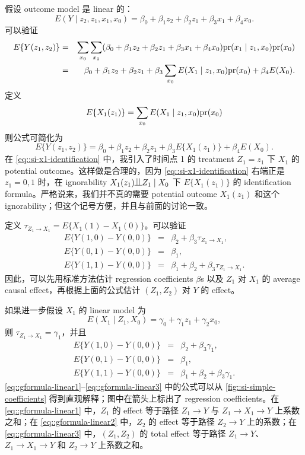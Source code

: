 \begin{example}\label{example::linear-si}
假设 outcome model 是 linear 的：
$$
E(Y\mid z_2,z_1,x_1, x_0) = \beta_0+ \beta_1 z_2 + \beta_2 z_1   + \beta_3  x_1  +\beta_4 x_0.
$$
可以验证
\begin{eqnarray*}
E\{ Y(z_1, z_2) \}  &=& \sum_{x_0} \sum_{x_1} (\beta_0+ \beta_1 z_2 + \beta_2 z_1 + \beta_3 x_1  +\beta_4 x_0) \textup{pr}(x_1\mid   z_1, x_0) \textup{pr}(x_0)  \\
&=& \beta_0 + \beta_1 z_2 + \beta_2  z_1  +  \beta_3 \sum_{x_0} E(X_1\mid z_1, x_0) \textup{pr}(x_0)  +\beta_4 E(X_0) .
\end{eqnarray*}
定义
\begin{equation}\label{eq::si-x1-identification}
E\{ X_1(z_1)\} = \sum_{x_0} E(X_1\mid z_1, x_0) \textup{pr}(x_0) 
\end{equation}
则公式可简化为
$$
E\{ Y(z_1, z_2) \}  = \beta_0 + \beta_1 z_2 + \beta_2 z_1  + \beta_3 E\{ X_1(z_1)\}   +\beta_4 E(X_0) .
$$
在 \cref{eq::si-x1-identification} 中，我引入了时间点 1 的 treatment $Z_1=z_1$ 下 $X_1$ 的 potential outcome。这样做是合理的，因为 \cref{eq::si-x1-identification} 右端正是 $z_1  = 0, 1$ 时，在 ignorability $X_1(z_1)\ind Z_1 \mid X_0$ 下 $E\{ X_1(z_1)\} $ 的 identification formula。严格说来，我们并不真的需要 potential outcome $X_1(z_1)$ 和这个 ignorability；但这个记号方便，并且与前面的讨论一致。
 
 
定义 $\tau_{Z_1\rightarrow X_1} = E\{ X_1(1)  - X_1(0)\}$。可以验证
\begin{eqnarray*}
E\{ Y(1,0)  - Y(0,0)\} &=& \beta_2 +  \beta_3 \tau_{Z_1\rightarrow X_1},\\
E\{ Y(0,1)  - Y(0,0)\} &=& \beta_1,\\
E\{ Y(1,1)  - Y(0,0)\} &=& \beta_1 +  \beta_2 + \beta_3 \tau_{Z_1\rightarrow X_1}.
\end{eqnarray*}
因此，可以先用标准方法估计 regression coefficients $\beta$s 以及 $Z_1$ 对 $X_1$ 的 average causal effect，再根据上面的公式估计 $(Z_1,Z_2)$ 对 $Y$ 的 effect。


如果进一步假设 $X_1$ 的 linear model 为
$$
E(X_1\mid Z_1, X_0) = \gamma_0 + \gamma_1 z_1 + \gamma_2 x_0,
$$
则 $\tau_{Z_1\rightarrow X_1} = \gamma_1$，并且
\begin{eqnarray} 
E\{ Y(1,0)  - Y(0,0)\} &=& \beta_2 +  \beta_3 \gamma_1,  \label{eq::gformula-linear1}\\
E\{ Y(0,1)  - Y(0,0)\} &=& \beta_1, \label{eq::gformula-linear2}\\
E\{ Y(1,1)  - Y(0,0)\} &=& \beta_1 +  \beta_2 + \beta_3 \gamma_1. \label{eq::gformula-linear3} 
\end{eqnarray}
\cref{eq::gformula-linear1}--\cref{eq::gformula-linear3} 中的公式可以从 \cref{fig::si-simple-coefficients} 得到直观解释；图中在箭头上标出了 regression coefficients。在 \cref{eq::gformula-linear1} 中，$Z_1$ 的 effect 等于路径 $Z_1\rightarrow Y$ 与 $Z_1\rightarrow X_1\rightarrow Y$ 上系数之和；在 \cref{eq::gformula-linear2} 中，$Z_2$ 的 effect 等于路径 $Z_2\rightarrow Y$ 上的系数；在 \cref{eq::gformula-linear3} 中，$(Z_1,Z_2)$ 的 total effect 等于路径 $Z_1\rightarrow Y$、$Z_1\rightarrow X_1\rightarrow Y$ 和 $Z_2\rightarrow Y$ 上系数之和。
\end{example}


